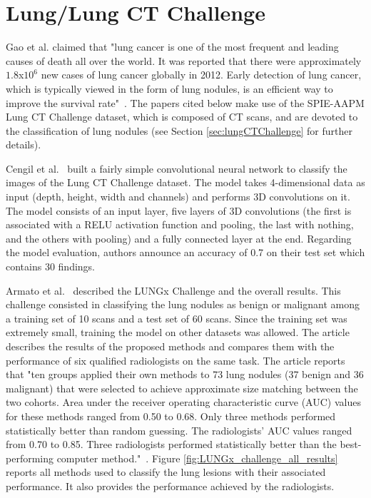 \section{Lung/Lung CT Challenge}
\setlength{\marginparwidth}{3cm}\leavevmode {}Gao et al. claimed that "lung cancer is one of the most frequent and leading causes of death all over the world. It was reported that there were approximately $1.8$x$10^6$ new cases of lung cancer globally in 2012. Early detection of lung cancer, which is typically viewed in the form of lung nodules, is an efficient way to improve the survival rate"~\cite{41}. The papers cited below make use of the SPIE-AAPM Lung CT Challenge dataset, which is composed of CT scans, and are devoted to the classification of lung nodules (see Section \ref{sec:lungCTChallenge} for further details).

Cengil et al.~\cite{02} built a fairly simple convolutional neural network to classify the images of the Lung CT Challenge dataset. The model takes 4-dimensional data as input (depth, height, width and channels) and performs 3D convolutions on it. The model consists of an input layer, five layers of 3D convolutions (the first is associated with a RELU activation function and pooling, the last with nothing, and the others with pooling) and a fully connected layer at the end. Regarding the model evaluation, authors announce an accuracy of 0.7 on their test set which contains 30 findings.

Armato et al.~\cite{12} described the LUNGx Challenge and the overall results. This challenge consisted in classifying the lung nodules as benign or malignant among a training set of 10 scans and a test set of 60 scans. Since the training set was extremely small, training the model on other datasets was allowed. The article describes the results of the proposed methods and compares them with the performance of six qualified radiologists on the same task. The article reports that "ten groups applied their own methods to 73 lung nodules (37 benign and 36 malignant) that were selected to achieve approximate size matching between the two cohorts. Area under the receiver operating characteristic curve (AUC) values for these methods ranged from 0.50 to 0.68. Only three methods performed statistically better than random guessing. The radiologists’ AUC values ranged from 0.70 to 0.85. Three radiologists performed statistically better than the best-performing computer method."~\cite{12}. Figure \ref{fig:LUNGx_challenge_all_results} reports all methods used to classify the lung lesions with their associated performance. It also provides the performance achieved by the radiologists.

